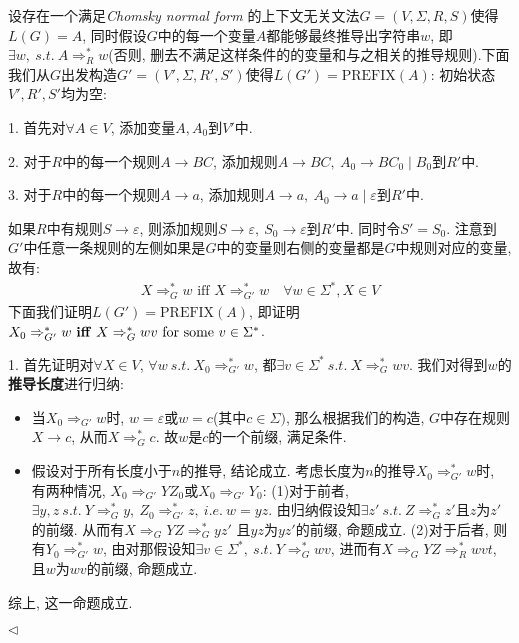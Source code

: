 \documentclass[11pt]{article}
\newenvironment{answer}[1][Answer]{\begin{trivlist}
\item[\hskip \labelsep{\bfseries\itshape#1.}\hskip \labelsep]}{\hfill$\lhd$\end{trivlist}}
\begin{document}
\begin{answer}
   设存在一个满足\emph{Chomsky normal form }的上下文无关文法$G = (V, \Sigma, R, S)$使得$L(G) = A$, 同时假设$G$中的每一个变量$A$都能够最终推导出字符串$w$, 即$\exists w, ~s.t.~ A \Rightarrow_R^* w$(否则, 删去不满足这样条件的的变量和与之相关的推导规则).下面我们从$G$出发构造$G' = (V', \Sigma, R', S')$使得$L(G') = \text{PREFIX}(A)$:
   初始状态$V', R', S'$均为空:

   1. 首先对$\forall A \in V$, 添加变量$A, A_0$到$V'$中.

   2. 对于$R$中的每一个规则$A \rightarrow BC$, 添加规则$A \rightarrow BC,~ A_0 \rightarrow BC_0 \mid B_0$到$R'$中.

   3. 对于$R$中的每一个规则$A \rightarrow a$, 添加规则$A \rightarrow a,~ A_0 \rightarrow a\mid \varepsilon$到$R'$中.

   如果$R$中有规则$S \rightarrow \varepsilon$, 则添加规则$S \rightarrow \varepsilon,~ S_0 \rightarrow \varepsilon$到$R'$中. 同时令$S' = S_0$. 注意到$G'$中任意一条规则的左侧如果是$G$中的变量则右侧的变量都是$G$中规则对应的变量, 故有:
   \begin{align*}
    X \Rightarrow_G^* w \text{ iff } X \Rightarrow_{G'}^* w \quad \forall w \in \Sigma^*, X \in V
   \end{align*}
   下面我们证明$L(G') = \text{PREFIX}(A)$, 即证明$X_0 \Rightarrow_{G'}^* w \text{ \textbf{iff} } X \Rightarrow_G^* wv \text{ for some } v \in \Sigma^*$.
   
   1. 首先证明对$\forall X \in V$, $\forall w ~s.t.~ X_0 \Rightarrow_{G'}^* w$, 都$\exists v\in \Sigma^* ~s.t.~ X \Rightarrow_G^* wv$. 我们对得到$w$的\textbf{推导长度}进行归纳:
   \begin{itemize}
    \item 当$X_0 \Rightarrow_{G'} w$时, $w = \varepsilon$或$w = c$(其中$c \in \Sigma)$, 那么根据我们的构造, $G$中存在规则$X \rightarrow c$, 从而$X \Rightarrow_G^* c$. 故$w$是$c$的一个前缀, 满足条件.
    \item 假设对于所有长度小于$n$的推导, 结论成立. 考虑长度为$n$的推导$X_0 \Rightarrow_{G'}^* w$时, 有两种情况, $X_0 \Rightarrow_{G'} YZ_0$或$X_0 \Rightarrow_{G'}Y_0$: (1)对于前者, $\exists y,z ~s.t.~ Y\Rightarrow_G^* y, ~Z_0 \Rightarrow_{G'}^* z, ~i.e.~ w = yz$. 由归纳假设知$\exists z' ~s.t.~ Z\Rightarrow_G^* z'$且$z$为$z'$的前缀. 从而有$X \Rightarrow_G YZ \Rightarrow_G^* yz'$ 且$yz$为$yz'$的前缀, 命题成立. (2)对于后者, 则有$Y_0 \Rightarrow_{G'}^* w$, 由对那假设知$\exists v\in \Sigma^*, ~s.t.~ Y\Rightarrow_G^* wv$, 进而有$X\Rightarrow_G YZ\Rightarrow_R^* wvt$, 且$w$为$wv$的前缀, 命题成立.
   \end{itemize}
   综上, 这一命题成立.


\end{answer}
\end{document}
